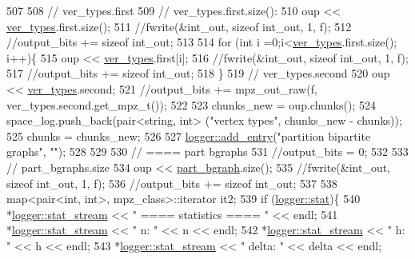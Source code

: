\begin{DoxyCode}
507 
508   \textcolor{comment}{// ver\_types.first}
509   \textcolor{comment}{// ver\_types.first.size():}
510   oup << \hyperlink{classmarked__graph__compressed_af446cc5e23c241a92b76642fd5ebc403}{ver\_types}.first.size();
511   \textcolor{comment}{//fwrite(&int\_out, sizeof int\_out, 1, f);}
512   \textcolor{comment}{//output\_bits += sizeof int\_out;}
513 
514   \textcolor{keywordflow}{for} (\textcolor{keywordtype}{int} i =0;i<\hyperlink{classmarked__graph__compressed_af446cc5e23c241a92b76642fd5ebc403}{ver\_types}.first.size(); i++)\{
515     oup <<  \hyperlink{classmarked__graph__compressed_af446cc5e23c241a92b76642fd5ebc403}{ver\_types}.first[i];
516     \textcolor{comment}{//fwrite(&int\_out, sizeof int\_out, 1, f);}
517     \textcolor{comment}{//output\_bits += sizeof int\_out;}
518   \}
519   \textcolor{comment}{// ver\_types.second}
520   oup << \hyperlink{classmarked__graph__compressed_af446cc5e23c241a92b76642fd5ebc403}{ver\_types}.second;
521   \textcolor{comment}{//output\_bits += mpz\_out\_raw(f, ver\_types.second.get\_mpz\_t());}
522 
523   chunks\_new = oup.chunks();
524   space\_log.push\_back(pair<string, int> (\textcolor{stringliteral}{"vertex types"}, chunks\_new - chunks));
525   chunks = chunks\_new;
526 
527   \hyperlink{classlogger_a710163deb17bc81f70d53d285b8ac9ac}{logger::add\_entry}(\textcolor{stringliteral}{"partition bipartite graphs"}, \textcolor{stringliteral}{""});
528   
529 
530   \textcolor{comment}{// ==== part bgraphs}
531   \textcolor{comment}{//output\_bits = 0;}
532 
533   \textcolor{comment}{// part\_bgraphs.size}
534   oup << \hyperlink{classmarked__graph__compressed_a7b3267063fba30b45eb21b3ba4e07536}{part\_bgraph}.size();
535   \textcolor{comment}{//fwrite(&int\_out, sizeof int\_out, 1, f);}
536   \textcolor{comment}{//output\_bits += sizeof int\_out;}
537 
538   map<pair<int, int>, mpz\_class>::iterator it2;
539   \textcolor{keywordflow}{if} (\hyperlink{classlogger_a26812b5ba03f130e8dae3446d5fc032f}{logger::stat})\{
540     *\hyperlink{classlogger_a7db37821f875f2ba3540980b355779f5}{logger::stat\_stream} << \textcolor{stringliteral}{" ==== statistics ==== "} << endl;
541     *\hyperlink{classlogger_a7db37821f875f2ba3540980b355779f5}{logger::stat\_stream} << \textcolor{stringliteral}{" n:                "} << n << endl;
542     *\hyperlink{classlogger_a7db37821f875f2ba3540980b355779f5}{logger::stat\_stream} << \textcolor{stringliteral}{" h:                "} << h << endl;
543     *\hyperlink{classlogger_a7db37821f875f2ba3540980b355779f5}{logger::stat\_stream} << \textcolor{stringliteral}{" delta:            "} << delta << endl;

\end{DoxyCode}
